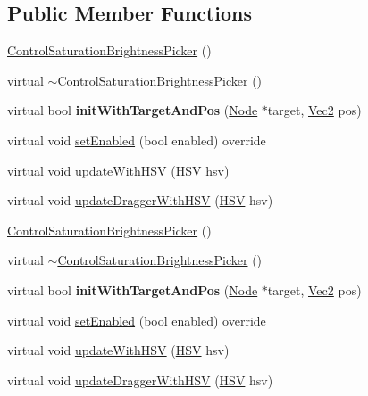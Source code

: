 \subsection*{Public Member Functions}
\begin{DoxyCompactItemize}
\item 
\hyperlink{classControlSaturationBrightnessPicker_ac29ab8199b7b88edb74fed2c5871cce2}{Control\+Saturation\+Brightness\+Picker} ()
\item 
virtual \hyperlink{classControlSaturationBrightnessPicker_a0393ef4d804ee57400085a24ed0f37a0}{$\sim$\+Control\+Saturation\+Brightness\+Picker} ()
\item 
\mbox{\label{classControlSaturationBrightnessPicker_ae6ff541f5844b3d69e8acbbcf0753c67}} 
virtual bool {\bfseries init\+With\+Target\+And\+Pos} (\hyperlink{classNode}{Node} $\ast$target, \hyperlink{classVec2}{Vec2} pos)
\item 
virtual void \hyperlink{classControlSaturationBrightnessPicker_af272e7bef89c1bcf19354bfaa76ebcb2}{set\+Enabled} (bool enabled) override
\item 
virtual void \hyperlink{classControlSaturationBrightnessPicker_a6a9680b12e0208ee60cf7b21c46fcc9d}{update\+With\+H\+SV} (\hyperlink{structHSV}{H\+SV} hsv)
\item 
virtual void \hyperlink{classControlSaturationBrightnessPicker_ac00ee384a1374e8986010551352edca4}{update\+Dragger\+With\+H\+SV} (\hyperlink{structHSV}{H\+SV} hsv)
\item 
\hyperlink{classControlSaturationBrightnessPicker_a8f06cdd1fb2390004b99f93a107ab33c}{Control\+Saturation\+Brightness\+Picker} ()
\item 
virtual \hyperlink{classControlSaturationBrightnessPicker_a1d429d33baedf0cb74a6e33a6f844864}{$\sim$\+Control\+Saturation\+Brightness\+Picker} ()
\item 
\mbox{\label{classControlSaturationBrightnessPicker_a2cc2edfaa616a193f7288e863e1d6b97}} 
virtual bool {\bfseries init\+With\+Target\+And\+Pos} (\hyperlink{classNode}{Node} $\ast$target, \hyperlink{classVec2}{Vec2} pos)
\item 
virtual void \hyperlink{classControlSaturationBrightnessPicker_a4b71c4cd73bbe398460360121e88e657}{set\+Enabled} (bool enabled) override
\item 
virtual void \hyperlink{classControlSaturationBrightnessPicker_a7d5146ce64f8a27edbf48e1070890311}{update\+With\+H\+SV} (\hyperlink{structHSV}{H\+SV} hsv)
\item 
virtual void \hyperlink{classControlSaturationBrightnessPicker_a4589f24ba01868ce37ef7267c6e10849}{update\+Dragger\+With\+H\+SV} (\hyperlink{structHSV}{H\+SV} hsv)
\end{DoxyCompactItemize}
